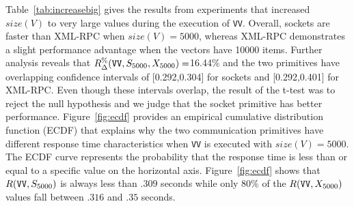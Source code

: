 \documentclass{sig-alternate}
\begin{document}





Table~\ref{tab:increasebig} gives the results from experiments that
increased $size(V)$ to very large values during the execution of
\texttt{VV}.  Overall, sockets are faster than XML-RPC when
$size(V)=5000$, whereas XML-RPC demonstrates a slight performance
advantage when the vectors have 10000 items.  Further analysis reveals
that {\small$R_\Delta^\%(\mbox{{\tt VV}},S_{5000},X_{5000})=$}16.44\% and
the two primitives have overlapping confidence intervals of
[0.292,0.304] for sockets and [0.292,0.401] for XML-RPC.  Even though
these intervals overlap, the result of the t-test was to reject the
null hypothesis and we judge that the socket primitive has better
performance.  Figure~\ref{fig:ecdf} provides an empirical cumulative
distribution function (ECDF) that explains why the two communication
primitives have different response time characteristics when {\tt VV}
is executed with $size(V)=5000$.  The ECDF curve represents the
probability that the response time is less than or equal to a specific
value on the horizontal axis.  Figure~\ref{fig:ecdf} shows that
$R(\mbox{{\tt VV}}, S_{5000})$ is always less than $.309$ seconds
while only $80\%$ of the $R(\mbox{{\tt VV}}, X_{5000})$ values fall
between $.316$ and $.35$ seconds.

\end{document}

